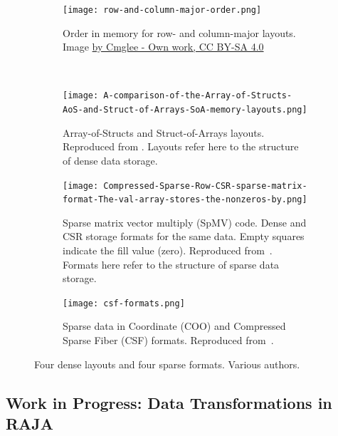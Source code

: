 \documentclass{article}
\begin{document}
\begin{figure}[h!]{}
\centering 
    \begin{subfigure}{.2\textwidth}
        \centering
        \texttt{[image: row-and-column-major-order.png]}
        \caption{Order in memory for row- and column-major layouts. Image \href{https://commons.wikimedia.org/w/index.php?curid=65107030}{by Cmglee - Own work, CC BY-SA 4.0}}
        \label{fig:layouts}
    \end{subfigure}
    ~
    \begin{subfigure}{.75\textwidth}
        \centering
        \texttt{[image: A-comparison-of-the-Array-of-Structs-AoS-and-Struct-of-Arrays-SoA-memory-layouts.png]}
        \caption{Array-of-Structs and Struct-of-Arrays layouts. Reproduced from \cite{pennycook2013investigation}. Layouts refer here to the structure of dense data storage.}
        \label{fig:aossoa}
    \end{subfigure}

    \vspace{2mm}
    \begin{subfigure}{\textwidth}
        \centering
        \texttt{[image: Compressed-Sparse-Row-CSR-sparse-matrix-format-The-val-array-stores-the-nonzeros-by.png]}
        \caption{Sparse matrix vector multiply (SpMV) code. Dense and CSR storage formats for the same data. Empty squares indicate the fill value (zero). Reproduced from~\cite{mohammadi2018sparse}.
        Formats here refer to the structure of sparse data storage.}
        \label{fig:csr}
    \end{subfigure}
    
    \vspace{2mm}


    \begin{subfigure}{\textwidth}
        \centering
        \texttt{[image: csf-formats.png]}
        \caption{Sparse data in Coordinate (COO) and Compressed Sparse Fiber (CSF) formats. Reproduced from~\cite{nisa2019load}.}
        \label{fig:csf}
    \end{subfigure}

\caption{Four dense layouts and four sparse formats. Various authors.}
\label{fig:formats}
\end{figure}


\subsection{Work in Progress: Data Transformations in RAJA}
\label{Sec:Work2}
\end{document}
